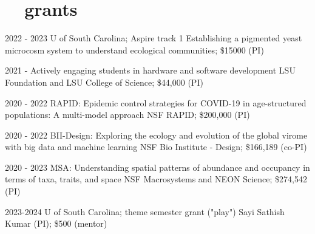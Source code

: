 \documentclass[]{CV}
\begin{document}
\section{\faDollar \ \ grants}

\begin{entrylist}


 \entry
 {2022 - 2023}
 {U of South Carolina; Aspire track 1}
 {Establishing a pigmented yeast microcosm system to understand ecological
 communities; \$15000 (PI)}

 \entry
 {2021 - }
 {Actively engaging students in hardware and software development}
 {LSU Foundation and LSU College of Science; \$44,000 (PI)}

 \entry
 {2020 - 2022}
 {RAPID: Epidemic control strategies for COVID-19 in age-structured populations: A multi-model approach }
 {NSF RAPID; \$200,000 (PI)}

 \entry
 {2020 - 2022}
 {BII-Design: Exploring the ecology and evolution of the global virome with big data and machine learning}
 {NSF Bio Institute - Design; \$166,189 (co-PI)}

 \entry
 {2020 - 2023}
 {MSA: Understanding spatial patterns of abundance and occupancy in terms of taxa, traits, and space}
 {NSF Macrosystems and NEON Science; \$274,542 (PI)}

 \entry
 {2023-2024}
 {U of South Carolina; theme semester grant ("play")}
 {Sayi Sathish Kumar (PI); \$500 (mentor)}















\end{entrylist}
\end{document}
